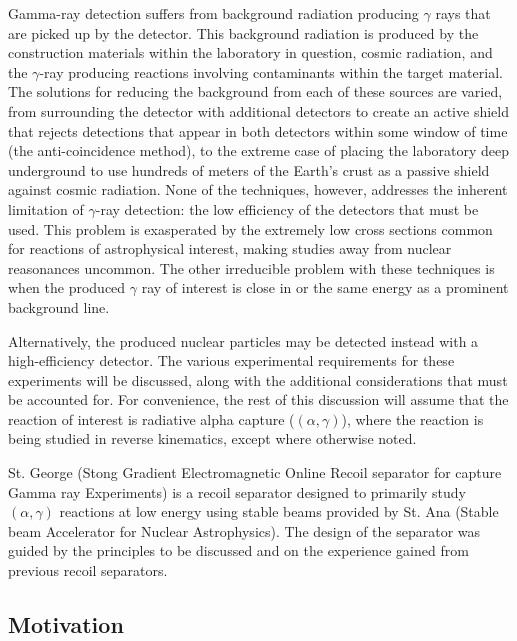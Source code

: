 Gamma-ray detection suffers from background radiation producing $\gamma$ rays
that are picked up by the detector. This background radiation is produced by
the construction materials within the laboratory in question, cosmic radiation,
and the $\gamma$-ray producing reactions involving contaminants within the
target material. The solutions for reducing the background from each of these
sources are varied, from surrounding the detector with additional detectors to
create an active shield that rejects detections that appear in both detectors
within some window of time (the anti-coincidence method), to the extreme case
of placing the laboratory deep underground to use hundreds of meters of the
Earth's crust as a passive shield against cosmic radiation. None of the
techniques, however, addresses the inherent limitation of $\gamma$-ray
detection: the low efficiency of the detectors that must be used. This problem
is exasperated by the extremely low cross sections common for reactions of
astrophysical interest, making studies away from nuclear reasonances uncommon.
The other irreducible problem with these techniques is when the produced
$\gamma$ ray of interest is close in or the same energy as a prominent
background line.

Alternatively, the produced nuclear particles may be detected instead with a
high-efficiency detector. The various experimental requirements for these
experiments will be discussed, along with the additional considerations that
must be accounted for. For convenience, the rest of this discussion will assume
that the reaction of interest is radiative alpha capture ($(\alpha,\gamma)$),
where the reaction is being studied in reverse kinematics, except where
otherwise noted.


St. George (Stong Gradient Electromagnetic Online Recoil separator for capture
Gamma ray Experiments) is a recoil separator designed to primarily study
$(\alpha,\gamma)$ reactions at low energy using stable beams provided by St.
Ana (Stable beam Accelerator for Nuclear Astrophysics). The design of the
separator was guided by the principles to be discussed and on the experience
gained from previous recoil separators.


\subsection{Motivation}

